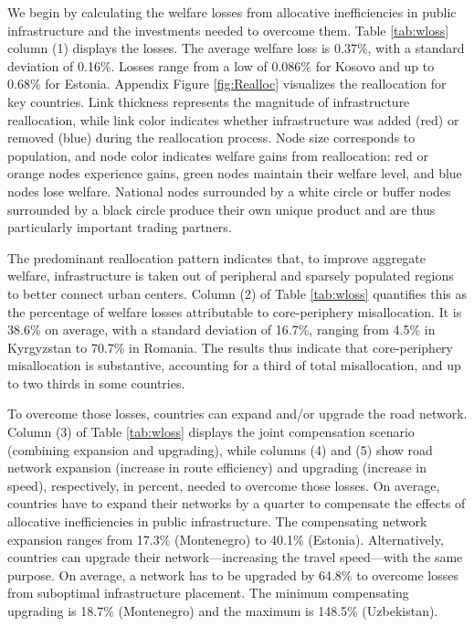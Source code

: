 \documentclass[a4paper]{article}
\begin{document}
We begin by calculating the welfare losses from allocative inefficiencies in public infrastructure and the investments needed to overcome them. Table \ref{tab:wloss} column (1) displays the losses. %
The average welfare loss is 0.37\%, with a standard deviation of 0.16\%. Losses range from a low of 0.086\% for Kosovo and up to 0.68\% for Estonia. Appendix Figure \ref{fig:Realloc} visualizes the reallocation for key countries. Link thickness represents the magnitude of infrastructure reallocation, while link color indicates whether infrastructure was added (red) or removed (blue) during the reallocation process. Node size corresponds to population, and node color indicates welfare gains from reallocation: red or orange nodes experience gains, green nodes maintain their welfare level, and blue nodes lose welfare. National nodes surrounded by a white circle or buffer nodes surrounded by a black circle produce their own unique product and are thus particularly important trading partners. \newline

The predominant reallocation pattern indicates that, to improve aggregate welfare, infrastructure is taken out of peripheral and sparsely populated regions to better connect urban centers. Column (2) of Table \ref{tab:wloss} quantifies this as the percentage of welfare losses attributable to core-periphery misallocation. It is 38.6\% on average, with a standard deviation of 16.7\%, ranging from 4.5\% in Kyrgyzstan to 70.7\% in Romania. The results thus indicate that core-periphery misallocation is substantive, accounting for a third of total misallocation, and up to two thirds in some countries. \newline


To overcome those losses, countries can expand and/or upgrade the road network. Column (3) of Table \ref{tab:wloss} displays the joint compensation scenario (combining expansion and upgrading), while columns (4) and (5) show road network expansion (increase in route efficiency) and upgrading (increase in speed), respectively, in percent, needed to overcome those losses. On average, countries have to expand their networks by a quarter to compensate the effects of allocative inefficiencies in public infrastructure. 
The compensating network expansion ranges from 17.3\% (Montenegro) to 40.1\% (Estonia). Alternatively, countries can upgrade their network---increasing the travel speed---with the same purpose. On average, a network has to be upgraded by 64.8\% to overcome losses from suboptimal infrastructure placement. %
The minimum compensating upgrading is 18.7\% (Montenegro) and the maximum is 148.5\% (Uzbekistan). \newline %
\end{document}
